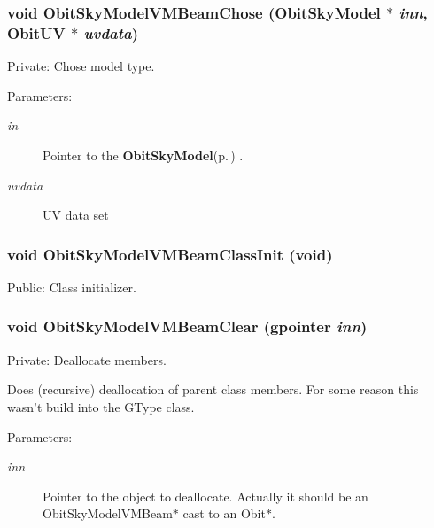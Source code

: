 \subsubsection{\setlength{\rightskip}{0pt plus 5cm}void Obit\-Sky\-Model\-VMBeam\-Chose ({\bf Obit\-Sky\-Model} $\ast$ {\em inn}, {\bf Obit\-UV} $\ast$ {\em uvdata})}\label{ObitSkyModelVMBeam_8c_a22}


Private: Chose model type. 

\begin{Desc}
\item[Parameters:]
\begin{description}
\item[{\em in}]Pointer to the {\bf Obit\-Sky\-Model}{\rm (p.\,\pageref{structObitSkyModel})} . \item[{\em uvdata}]UV data set \end{description}
\end{Desc}
\subsubsection{\setlength{\rightskip}{0pt plus 5cm}void Obit\-Sky\-Model\-VMBeam\-Class\-Init (void)}\label{ObitSkyModelVMBeam_8c_a21}


Public: Class initializer. 

\subsubsection{\setlength{\rightskip}{0pt plus 5cm}void Obit\-Sky\-Model\-VMBeam\-Clear (gpointer {\em inn})}\label{ObitSkyModelVMBeam_8c_a7}


Private: Deallocate members. 

Does (recursive) deallocation of parent class members. For some reason this wasn't build into the GType class. \begin{Desc}
\item[Parameters:]
\begin{description}
\item[{\em inn}]Pointer to the object to deallocate. Actually it should be an Obit\-Sky\-Model\-VMBeam$\ast$ cast to an Obit$\ast$. \end{description}
\end{Desc}
